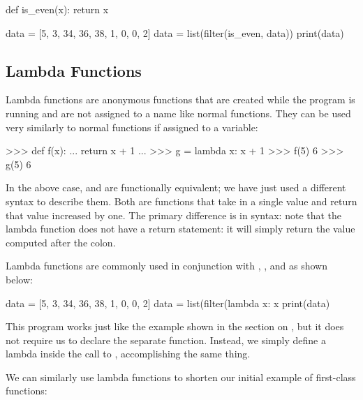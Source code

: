 \documentclass[11pt]{cselabheader}
\begin{document}
\begin{python3code}
def is_even(x):
    return x %

data = [5, 3, 34, 36, 38, 1, 0, 0, 2]
data = list(filter(is_even, data))
print(data)
\end{python3code}

\begin{verbatimcode}
[34, 36, 38, 0, 0, 2]
\end{verbatimcode}

\subsection{Lambda Functions}
\label{subsec:lambda}
Lambda functions are anonymous functions that are created while the program is
running and are not assigned to a name like normal functions. They can be used
very similarly to normal functions if assigned to a variable:

\begin{pyconcode}
>>> def f(x):
...   return x + 1
... 
>>> g = lambda x: x + 1
>>> f(5)
6
>>> g(5)
6
\end{pyconcode}

In the above case,  and  are functionally equivalent;
we have just used a different syntax to describe them. 
Both are functions that take in a single value and return that value increased
by one. The primary difference is in syntax: note that the lambda function does
not have a return statement: it will simply return the value computed after the
colon.

Lambda functions are commonly used in conjunction with ,
, and  as shown below:

\begin{python3code}
data = [5, 3, 34, 36, 38, 1, 0, 0, 2]
data = list(filter(lambda x: x %
print(data)
\end{python3code}

\begin{verbatimcode}
[34, 36, 38, 0, 0, 2]
\end{verbatimcode}

This program works just like the example shown in the section on
, but it does not require us to declare the separate
 function. Instead, we simply define a lambda inside the call
to , accomplishing the same thing.

We can similarly use lambda functions to shorten our initial example of
first-class functions:
\end{document}
